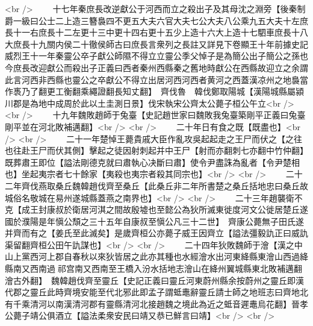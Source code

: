 <br />
　　十七年秦庶長改逆獻公于河西而立之殺出子及其母沈之淵旁【後秦制爵一級曰公士二上造三簪裊四不更五大夫六官大夫七公大夫八公乘九五大夫十左庶長十一右庶長十二左更十三中更十四右更十五少上造十六大上造十七駟車庶長十八大庶長十九關内侯二十徹侯師古曰庶長言衆列之長註又詳見下卷顯王十年前據史記威烈王十一年秦靈公卒子獻公師隰不得立立靈公季父悼子是為簡公出子簡公之孫也今庶長改迎獻公而殺出子正義曰西者秦州西縣秦之舊地時獻公在西縣故迎立之余謂此言河西非西縣也靈公之卒獻公不得立出居河西河西者黄河之西蓋漢凉州之地裊當作褭乃了翻更工衡翻乘繩證翻長知丈翻】　齊伐魯　韓伐鄭取陽城【漢陽城縣屬潁川郡是為地中成周於此以土圭測日景】伐宋執宋公齊太公薨子桓公午立<br />
<br />
　　十九年魏敗趙師于兔臺【史記趙世家曰魏敗我兔臺築剛平正義曰兔臺剛平並在河北敗補邁翻】<br />
<br />
　　二十年日有食之既【既盡也】<br />
<br />
　　二十一年楚悼王薨貴戚大臣作亂攻吳起起走之王尸而伏之【之往也往赴王尸而伏其側】擊起之徒因射刺起并中王尸【射而亦翻刺七亦翻中竹仲翻】既葬肅王即位【謚法剛德克就曰肅執心决斷曰肅】使令尹盡誅為亂者【令尹楚相也】坐起夷宗者七十餘家【夷殺也夷宗者殺其同宗也】<br />
<br />
　　二十二年齊伐燕取桑丘魏韓趙伐齊至桑丘【此桑丘非二年所書楚之桑丘括地忠曰桑丘故城俗名敬城在易州遂城縣蓋燕之南界也】<br />
<br />
　　二十三年趙襲衛不克【成王封康叔於衛居河淇之間故殷墟也至懿公為狄所滅東徙度河文公徙居楚丘遂國於濮陽是年愼公頹之三十五年自康叔至愼公凡三十二世】　齊康公薨無子田氏遂并齊而有之【姜氏至此滅矣】是歲齊桓公亦薨子威王因齊立【謚法彊毅訅正曰威訅渠留翻齊桓公田午訅謀也】<br />
<br />
　　二十四年狄敗魏師于澮【漢之中山上黨西河上郡自春秋以來狄皆居之此亦其種也水經澮水出河東絳縣東澮山西過絳縣南又西南過祁宫南又西南至王橋入汾水括地志澮山在絳州翼城縣東北敗補邁翻澮古外翻】　魏韓趙伐齊至靈丘【史記正義曰靈丘河東蔚州縣余按蔚州之靈丘即漢代郡之靈丘此時齊境安能至代北邪此即孟子謂蚳鼃辭靈丘請士師之地班志曰齊地北有千乘清河以南漢清河郡有靈縣清河北接趙魏之境此為近之蚳音遲鼃烏花翻】晉孝公薨子靖公俱酒立【謚法柔衆安民曰靖又恭已鮮言曰靖】<br />
<br />
